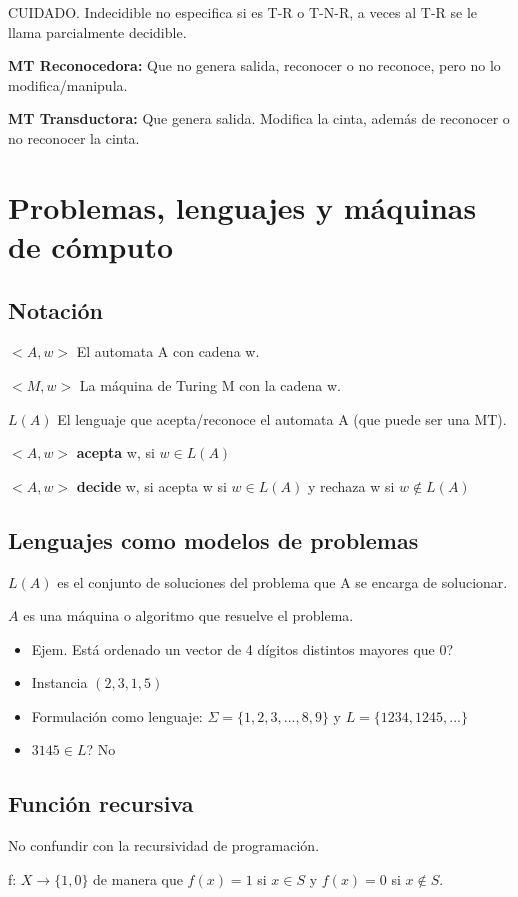 CUIDADO. Indecidible no especifica si es T-R o T-N-R, a veces al T-R se le llama parcialmente decidible.

\textbf{MT Reconocedora:} Que no genera salida, reconocer o no reconoce, pero no lo modifica/manipula.

\textbf{MT Transductora:} Que genera salida. Modifica la cinta, además de reconocer o no reconocer la cinta.

\section{Problemas, lenguajes y máquinas de cómputo}
\subsection{Notación}
$<A,w>$ El automata A con cadena w.

$<M,w>$ La máquina de Turing M con la cadena w.

$L(A)$ El lenguaje que acepta/reconoce el automata A (que puede ser una MT).

$<A, w>$ \textbf{acepta} w, si $w \in L(A)$

$<A, w>$ \textbf{decide} w, si acepta w si $w \in L(A)$ y rechaza w si $w \notin L(A)$

\subsection{Lenguajes como modelos de problemas}
$L(A)$ es el conjunto de soluciones del problema que A se encarga de solucionar.

$A$ es una máquina o algoritmo que resuelve el problema.

\begin{itemize}
	\item Ejem. Está ordenado un vector de 4 dígitos distintos mayores que 0?
	\item Instancia $(2, 3, 1, 5)$
	\item Formulación como lenguaje: $\Sigma = \{1,2,3,...,8,9\}$ y $L=\{1234,1245,...\}$
	\item $3145 \in L$? No
\end{itemize}
\pagebreak

\subsection{Función recursiva}
No confundir con la recursividad de programación.

f: $X \rightarrow \{1,0\}$ de manera que $f(x) = 1$ si $x \in S$ y $f(x) = 0$ si $x \notin S$.


